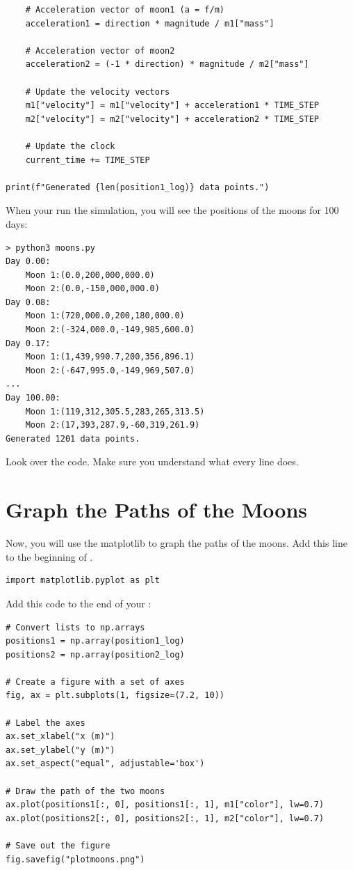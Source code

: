 \begin{verbatim}
    # Acceleration vector of moon1 (a = f/m)
    acceleration1 = direction * magnitude / m1["mass"]

    # Acceleration vector of moon2
    acceleration2 = (-1 * direction) * magnitude / m2["mass"]

    # Update the velocity vectors
    m1["velocity"] = m1["velocity"] + acceleration1 * TIME_STEP
    m2["velocity"] = m2["velocity"] + acceleration2 * TIME_STEP

    # Update the clock
    current_time += TIME_STEP

print(f"Generated {len(position1_log)} data points.")
\end{verbatim}

When your run the simulation,  you will see the positions of the moons for 100 days:
\begin{verbatim}
> python3 moons.py 
Day 0.00:
	Moon 1:(0.0,200,000,000.0)
	Moon 2:(0.0,-150,000,000.0)
Day 0.08:
	Moon 1:(720,000.0,200,180,000.0)
	Moon 2:(-324,000.0,-149,985,600.0)
Day 0.17:
	Moon 1:(1,439,990.7,200,356,896.1)
	Moon 2:(-647,995.0,-149,969,507.0)
...
Day 100.00:
	Moon 1:(119,312,305.5,283,265,313.5)
	Moon 2:(17,393,287.9,-60,319,261.9)
Generated 1201 data points.
\end{verbatim}

Look over the code. Make sure you understand what every line does.

\section{Graph the Paths of the Moons}

Now, you will use the matplotlib to graph the paths of the moons. Add this line to the beginning of 
.

\begin{verbatim}
import matplotlib.pyplot as plt
\end{verbatim}


Add this code to the end of your :

\begin{verbatim}
# Convert lists to np.arrays
positions1 = np.array(position1_log)
positions2 = np.array(position2_log)

# Create a figure with a set of axes
fig, ax = plt.subplots(1, figsize=(7.2, 10))

# Label the axes
ax.set_xlabel("x (m)")
ax.set_ylabel("y (m)")
ax.set_aspect("equal", adjustable='box')

# Draw the path of the two moons
ax.plot(positions1[:, 0], positions1[:, 1], m1["color"], lw=0.7)
ax.plot(positions2[:, 0], positions2[:, 1], m2["color"], lw=0.7)

# Save out the figure
fig.savefig("plotmoons.png")
\end{verbatim}

